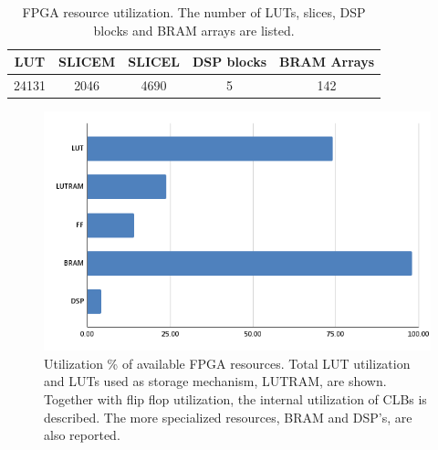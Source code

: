 \documentclass[12pt]{report}
\begin{document}
\begin{table}[h]
    \centering
    \begin{tabular}{|c|c|c|c|c|}
        \hline
        \textbf{LUT}& \textbf{SLICEM}& \textbf{SLICEL}& \textbf{DSP blocks}& \textbf{BRAM Arrays}\\
        \hline
        24131&2046&4690&5&142\\
        \hline
    \end{tabular}
    \caption{FPGA resource utilization. The number of LUTs, slices, DSP blocks and BRAM arrays are listed.}
    \label{table:fpga_res}
\end{table}

\begin{figure}[h]
    \centering
    \includegraphics[scale=0.65]{figures/utilization.png}
    \caption{Utilization \% of available FPGA resources. Total LUT utilization and LUTs used as storage mechanism, LUTRAM, are shown. Together with flip flop utilization, the internal utilization of CLBs is described. The more specialized resources, BRAM and DSP's, are also reported.}
    \label{fig:fpga_util}
\end{figure}
\end{document}
